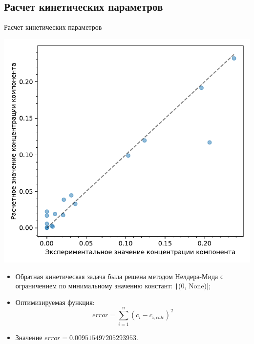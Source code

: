 \documentclass[aspectratio=169, mathserif]{beamer}%
\begin{document}
\subsection{Расчет кинетических параметров}
\begin{frame}[fragile, label=c]{Расчет кинетических параметров}
\scriptsize
\begin{minipage}{.6\textwidth}
\includegraphics[width=\linewidth]{./pics/err}
\end{minipage}
\begin{minipage}{.39\textwidth}
\begin{itemize}
\item Обратная кинетическая задача была решена методом Нелдера-Мида с ограничением по минимальному значению констант: \texttt|(0, None)|;
\item Оптимизируемая функция:
\vfill
$$
	error = \sum \limits _{i=1} ^{n} \left(c_i - c_{i, calc}\right) ^2
$$
\vfill
\item Значение $error = 0.009515497205293953$.
\end{itemize}
\vfill
\end{minipage}
\vfill
\end{frame}



\end{document}
